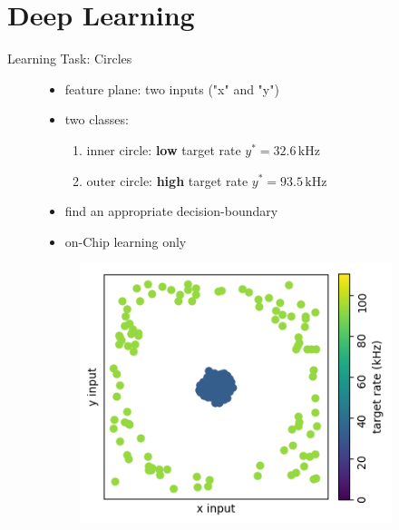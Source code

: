 \documentclass[12pt, aspectratio=169]{beamer}
\begin{document}
\section[Learning]{Deep Learning}
\begin{frame}{Learning Task: Circles}
    \begin{figure}[!htb]
            \begin{itemize}
                \item feature plane: two inputs ("x" and "y")
                \item two classes:
                \begin{enumerate}
                    \item inner circle: \textbf{low} target rate $y^* = 32.6\, \text{kHz}$
                    \item outer circle: \textbf{high} target rate $y^* = 93.5\, \text{kHz}$
                \end{enumerate}
                \item find an appropriate decision-boundary
                \item on-Chip learning only
            \end{itemize}
      	\endminipage\hfill
            \centering
            \begin{figure}
                \includegraphics[scale=0.5]{targets.png}
                \label{membrane_potential}
            \end{figure}
        \endminipage\hfill
    \end{figure}
\end{frame}
\end{document}

